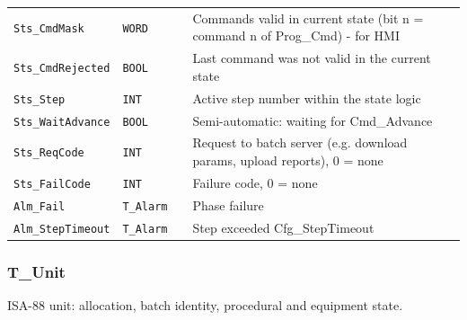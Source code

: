 {\begin{longtable}{@{}>{\raggedright\arraybackslash}p{3.4cm}>{\raggedright\arraybackslash}p{3.3cm}>{\raggedright\arraybackslash}p{1.3cm}>{\raggedright\arraybackslash}p{6.4cm}@{}}
\texttt{Sts\_CmdMask} & \texttt{WORD} &  & Commands valid in current state (bit n = command n of Prog\_Cmd) - for HMI \\
\texttt{Sts\_CmdRejected} & \texttt{BOOL} &  & Last command was not valid in the current state \\
\texttt{Sts\_Step} & \texttt{INT} &  & Active step number within the state logic \\
\texttt{Sts\_WaitAdvance} & \texttt{BOOL} &  & Semi-automatic: waiting for Cmd\_Advance \\
\texttt{Sts\_ReqCode} & \texttt{INT} &  & Request to batch server (e.g. download params, upload reports), 0 = none \\
\texttt{Sts\_FailCode} & \texttt{INT} &  & Failure code, 0 = none \\
\texttt{Alm\_Fail} & \texttt{T\_Alarm} &  & Phase failure \\
\texttt{Alm\_StepTimeout} & \texttt{T\_Alarm} &  & Step exceeded Cfg\_StepTimeout \\
\bottomrule
\end{longtable}
}
\subsubsection*{T\_Unit}
\label{app:pclib:tunit}
ISA-88 unit: allocation, batch identity, procedural and equipment state.


